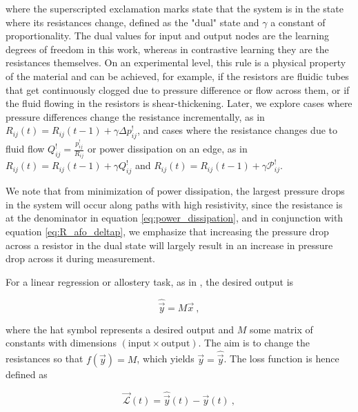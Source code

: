 \documentclass[%
 reprint,
 amsmath,amssymb,
 aps,
]{revtex4-2}
\begin{document}
     where the superscripted exclamation marks state that the system is in the state where its resistances change, defined as the "dual" state and $\gamma$ a constant of proportionality. The dual values for input and output nodes are the learning degrees of freedom in this work, whereas in contrastive learning \cite{dillavou2022demonstration} they are the resistances themselves.
     On an experimental level, this rule is a physical property of the material and can be achieved, for example, if the resistors are fluidic tubes that get continuously clogged due to pressure difference or flow across them, or if the fluid flowing in the resistors is shear-thickening. 
    Later, we explore cases where pressure differences change the resistance incrementally, as in $R_{ij}\left(t\right)=R_{ij}\left(t-1\right) + \gamma \Delta p^!_{ij}$, and cases where the resistance changes due to fluid flow $Q^!_{ij}=\frac{p^!_{ij}}{R_{ij}}$ or power dissipation on an edge, as in $R_{ij}\left(t\right) = R_{ij}\left(t-1\right) + \gamma Q^!_{ij}$ and $R_{ij}\left(t\right)=R_{ij}\left(t-1\right) + \gamma \mathcal{P}^!_{ij}$.

    We note that from minimization of power dissipation, the largest pressure drops in the system will occur along paths with high resistivity, since the resistance is at the denominator in equation \ref{eq:power_dissipation}, and in conjunction with equation \ref{eq:R_afo_deltap}, we emphasize that increasing the pressure drop across a resistor in the dual state will largely result in an increase in pressure drop across it during measurement.

    For a linear regression or allostery task, as in \cite{dillavou2022demonstration, altman2024experimental}, the desired output is

    \begin{equation}\label{eq:task}
        \widehat{\vec{y}}=M\vec{x} \ ,
    \end{equation}

    where the hat symbol represents a desired output and $M$ some matrix of constants with dimensions $\left(\text{input}\times\text{output}\right)$. 
    The aim is to change the resistances so that $f\left(\vec{y}\right)=M$, which yields $\vec{y}=\widehat{\vec{y}}$. The loss function is hence defined as

    \begin{equation}\label{eq:loss}    \vec{\mathcal{L}}\left(t\right)=\widehat{\vec{y}}\left(t\right)-\vec{y}\left(t\right) \ ,
    \end{equation}
    
\end{document}
